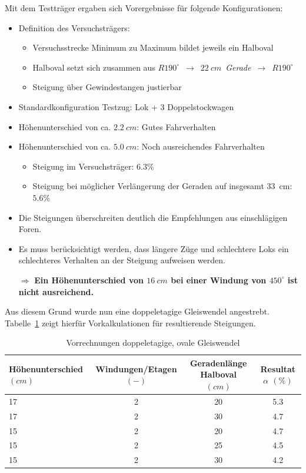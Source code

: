 Mit dem Testtr\"ager ergaben sich Vorergebnisse f\"ur folgende Konfigurationen:
\begin{itemize}
	\item Definition des Versuchstr\"agers:
	\begin{itemize}
		\item Versuchsstrecke Minimum zu Maximum bildet jeweils ein Halboval
		\item Halboval setzt sich zusammen aus $R1 90^\circ$~$\rightarrow$~$22~cm$~\textit{Gerade}~$\rightarrow$~$R1 90^\circ$
		\item Steigung \"uber Gewindestangen justierbar
	\end{itemize}
	\item Standardkonfiguration Testzug: Lok + 3 Doppelstockwagen
	\item H\"ohenunterschied von ca. $2.2~cm$: Gutes Fahrverhalten
	\item H\"ohenunterschied von ca. $5.0~cm$: Noch ausreichendes Fahrverhalten
	\begin{itemize}
		\item Steigung im Versuchstr\"ager: $6.3\%$
		\item Steigung bei m\"oglicher Verl\"angerung der Geraden auf insgesamt 33~cm: $5.6\%$
	\end{itemize}
	\item Die Steigungen \"uberschreiten deutlich die Empfehlungen aus einschl\"agigen Foren.
	\item Es muss ber\"ucksichtigt werden, dass l\"angere Z\"uge und schlechtere Loks ein schlechteres Verhalten an der Steigung aufweisen werden.
	\item[$\Rightarrow$] \textbf{Ein H\"ohenunterschied von $16~cm$ bei einer Windung von $450^\circ$ ist nicht ausreichend.}
\end{itemize}

Aus diesem Grund wurde nun eine doppeletagige Gleiswendel angestrebt.
Tabelle~\ref{tab:anlage_trackHelix_pre_calc_doubleHelix} zeigt hierf\"ur Vorkalkulationen f\"ur resultierende Steigungen.

\begin{table}[h]
	\centering
		\begin{tabular}{lccc}
			H\"ohenunterschied $(cm)$ & Windungen/Etagen $(-)$ & Geradenl\"ange Halboval $(cm)$ & Resultat $\alpha$ $(\%)$ \\
			\hline
			17 & 2 & 20 & 5.3 \\
			17 & 2 & 30 & 4.7 \\
			15 & 2 & 20 & 4.7 \\
			15 & 2 & 25 & 4.5 \\
			15 & 2 & 30 & 4.2 \\
		\end{tabular}
	\caption{Vorrechnungen doppeletagige, ovale Gleiswendel}
	\label{tab:anlage_trackHelix_pre_calc_doubleHelix}
\end{table}








